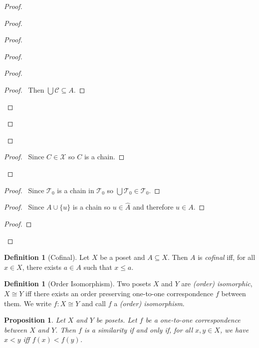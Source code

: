 \documentclass{report}
\let\qed\relax
\newtheorem{prop}[ax]{Proposition}
\theoremstyle{definition}
\newtheorem{df}[ax]{Definition}
\begin{document}
\begin{proof}
\begin{proof}
\begin{proof}
\begin{proof}
\begin{proof}
				\begin{proof}
					\pf\ Then $\bigcup \mathcal{C} \subseteq A$.
				\end{proof}
			\end{proof}
		\end{proof}
	\end{proof}
	\begin{proof}
		\pf\ Since $C \in \mathcal{X}$ so $C$ is a chain.
	\end{proof}
\end{proof}
\begin{proof}
	\pf\ Since $\mathcal{T}_0$ is a chain in $\mathcal{T}_0$ so $\bigcup \mathcal{T}_0 \in \mathcal{T}_0$.
\end{proof}
\begin{proof}
	\pf\ Since $A \cup \{u\}$ is a chain so $u \in \hat{A}$ and therefore $u \in A$.
\end{proof}
\begin{proof}
\end{proof}
\qed
\end{proof}

\begin{df}[Cofinal]
Let $X$ be a poset and $A \subseteq X$. Then $A$ is \emph{cofinal} iff, for all $x \in X$, there exists $a \in A$ such that $x \leq a$.
\end{df}

\begin{df}[Order Isomorphism]
Two posets $X$ and $Y$ are \emph{(order) isomorphic}, $X \cong Y$ iff there exists an order preserving one-to-one correspondence $f$ between them. We write $f : X \cong Y$ and call $f$ a \emph{(order) isomorphism}.
\end{df}

\begin{prop}
Let $X$ and $Y$ be posets. Let $f$ be a one-to-one correspondence between $X$ and $Y$. Then $f$ is a similarity if and only if, for all $x,y \in X$, we have $x < y$ iff $f(x) < f(y)$.
\end{prop}
\end{document}
